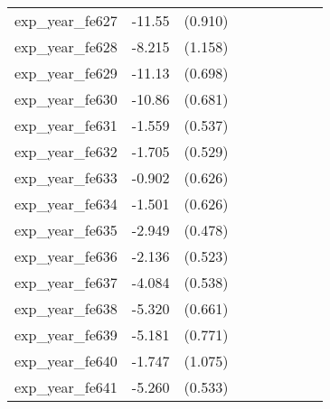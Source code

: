 {\begin{tabular}{l*{4}{cc}}
exp\_year\_fe627&   -11.55\sym{***}&  (0.910)&                  &         &                  &         &                  &         \\
exp\_year\_fe628&   -8.215\sym{***}&  (1.158)&                  &         &                  &         &                  &         \\
exp\_year\_fe629&   -11.13\sym{***}&  (0.698)&                  &         &                  &         &                  &         \\
exp\_year\_fe630&   -10.86\sym{***}&  (0.681)&                  &         &                  &         &                  &         \\
exp\_year\_fe631&   -1.559\sym{**} &  (0.537)&                  &         &                  &         &                  &         \\
exp\_year\_fe632&   -1.705\sym{**} &  (0.529)&                  &         &                  &         &                  &         \\
exp\_year\_fe633&   -0.902         &  (0.626)&                  &         &                  &         &                  &         \\
exp\_year\_fe634&   -1.501\sym{*}  &  (0.626)&                  &         &                  &         &                  &         \\
exp\_year\_fe635&   -2.949\sym{***}&  (0.478)&                  &         &                  &         &                  &         \\
exp\_year\_fe636&   -2.136\sym{***}&  (0.523)&                  &         &                  &         &                  &         \\
exp\_year\_fe637&   -4.084\sym{***}&  (0.538)&                  &         &                  &         &                  &         \\
exp\_year\_fe638&   -5.320\sym{***}&  (0.661)&                  &         &                  &         &                  &         \\
exp\_year\_fe639&   -5.181\sym{***}&  (0.771)&                  &         &                  &         &                  &         \\
exp\_year\_fe640&   -1.747         &  (1.075)&                  &         &                  &         &                  &         \\
exp\_year\_fe641&   -5.260\sym{***}&  (0.533)&                  &         &                  &         &                  &         \\

\end{tabular}}
